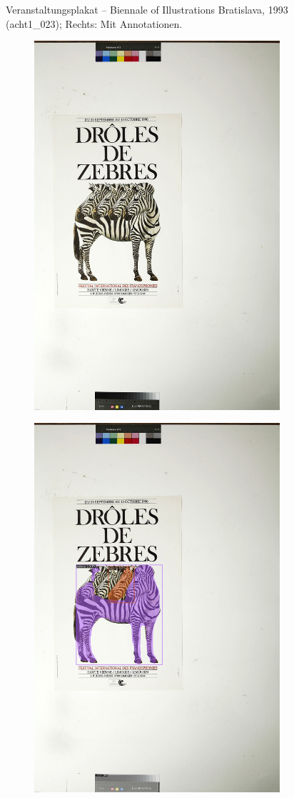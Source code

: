 \documentclass[a4paper,12pt,ngerman]{article}
\begin{document}
\begin{landscape}
\begin{figure}[ht]
\begin{subfigure}[b]{0.5\linewidth}
	\end{subfigure}
	\caption{Veranstaltungsplakat – Biennale of Illustrations Bratislava, 1993 (acht1\_023); Rechts: Mit Annotationen.}
\end{figure}
\end{landscape}

\newpage
\begin{landscape}
\begin{figure}[ht]
	\begin{subfigure}[b]{0.5\linewidth}
	\centering
	\includegraphics[height=\linewidth]{Abbildung_31_(acht1_016)}
	\end{subfigure}
	\begin{subfigure}[b]{0.5\linewidth}
	\centering
	\includegraphics[height=\linewidth]{Abbildung_31_(acht1_016)_with_detections}

\end{subfigure}
\end{figure}
\end{landscape}
\end{document}
